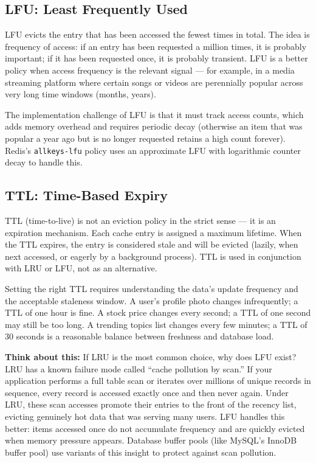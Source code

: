 \documentclass[11pt,a4paper]{article}
\begin{document}
\subsection{LFU: Least Frequently Used}

LFU evicts the entry that has been accessed the fewest times in total. The idea is frequency of access: if an entry has been requested a million times, it is probably important; if it has been requested once, it is probably transient. LFU is a better policy when access frequency is the relevant signal --- for example, in a media streaming platform where certain songs or videos are perennially popular across very long time windows (months, years).

The implementation challenge of LFU is that it must track access counts, which adds memory overhead and requires periodic decay (otherwise an item that was popular a year ago but is no longer requested retains a high count forever). Redis's \texttt{allkeys-lfu} policy uses an approximate LFU with logarithmic counter decay to handle this.

\subsection{TTL: Time-Based Expiry}

TTL (time-to-live) is not an eviction policy in the strict sense --- it is an expiration mechanism. Each cache entry is assigned a maximum lifetime. When the TTL expires, the entry is considered stale and will be evicted (lazily, when next accessed, or eagerly by a background process). TTL is used in conjunction with LRU or LFU, not as an alternative.

Setting the right TTL requires understanding the data's update frequency and the acceptable staleness window. A user's profile photo changes infrequently; a TTL of one hour is fine. A stock price changes every second; a TTL of one second may still be too long. A trending topics list changes every few minutes; a TTL of 30 seconds is a reasonable balance between freshness and database load.

\begin{thinkbox}
\textbf{Think about this:} If LRU is the most common choice, why does LFU exist? LRU has a known failure mode called ``cache pollution by scan.'' If your application performs a full table scan or iterates over millions of unique records in sequence, every record is accessed exactly once and then never again. Under LRU, these scan accesses promote their entries to the front of the recency list, evicting genuinely hot data that was serving many users. LFU handles this better: items accessed once do not accumulate frequency and are quickly evicted when memory pressure appears. Database buffer pools (like MySQL's InnoDB buffer pool) use variants of this insight to protect against scan pollution.
\end{thinkbox}
\end{document}
